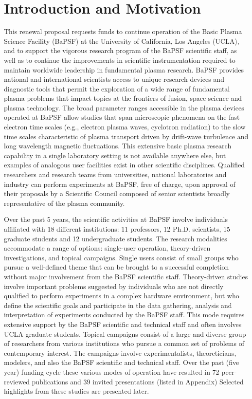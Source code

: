 \documentclass[11pt]{article}
\date{}
\title{}
\begin{document}
\section{Introduction and Motivation}

This renewal proposal requests funds to continue operation of the Basic
Plasma Science Facility (BaPSF) at the University of California, Los
Angeles (UCLA), and to support the vigorous research program of the
BaPSF scientific staff, as well as to continue the improvements in
scientific instrumentation required to maintain worldwide leadership in
fundamental plasma research.  BaPSF provides national and international scientists access to unique
research devices and diagnostic tools that permit the exploration of a
wide range of fundamental plasma problems that impact topics at the
frontiers of fusion, space science and plasma technology. The broad
parameter ranges accessible in the plasma devices operated at BaPSF
allow studies that span microscopic phenomena on the fast electron time
scales (e.g., electron plasma waves, cyclotron radiation) to the slow
time scales characteristic of plasma transport driven by drift-wave
turbulence and long wavelength magnetic fluctuations. This extensive
basic plasma research capability in a single laboratory setting is not
available anywhere else, but examples of analogous user facilities exist
in other scientific disciplines. Qualified researchers and research
teams from universities, national laboratories and industry can perform
experiments at BaPSF, free of charge, upon approval of their proposals
by a Scientific Council composed of senior scientists broadly
representative of the plasma community.

Over the past 5 years, the scientific activities at BaPSF involve
individuals affiliated with 18 different institutions: 11 professors,
12 Ph.D. scientists, 15 graduate students and 12 undergraduate
students.  The research modalities accommodate a range of options:
single-user operation, theory-driven investigations, and topical
campaigns. Single users consist of small groups who pursue a
well-defined theme that can be brought to a successful completion
without major involvement from the BaPSF scientific
staff. Theory-driven studies involve important problems suggested by
individuals who are not directly qualified to perform experiments in a
complex hardware environment, but who define the scientific goals and
participate in the data gathering, analysis and interpretation of
experiments conducted by the BaPSF staff. This mode requires extensive
support by the BaPSF scientific and technical staff and often involves
UCLA graduate students. Topical campaigns consist of a large and
diverse group of researchers from various institutions who pursue a
common set of problems of contemporary interest. The campaigns involve
experimentalists, theoreticians, modelers, and also the BaPSF
scientific and technical staff. Over the past (five year) funding
cycle these various modes of operation have resulted in 72 peer-reviewed
publications and 39 invited presentations (listed in Appendix)
Selected highlights from these studies are presented later.
\end{document}
